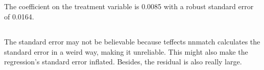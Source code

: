 \documentclass{article}
\begin{document}
\subsection{}
The coefficient on the treatment variable is 0.0085 with a robust standard error of 0.0164. 

\subsection{}
The standard error may not be believable because teffects nnmatch calculates the standard error in a weird way, making it unreliable. This might also make the regression's standard error inflated.  
\newline
\newline
Besides, the residual is also really large.  
\end{document}
